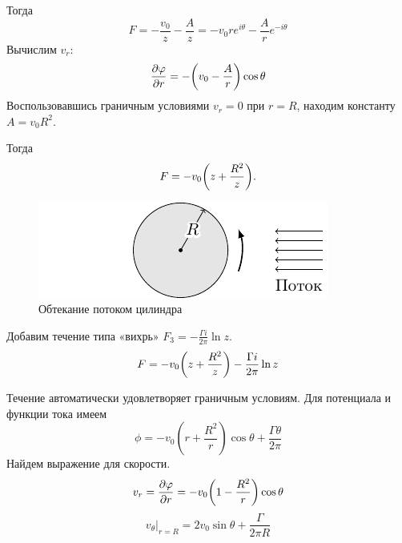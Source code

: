 Тогда
 $$ F=-\frac{v_0}{z}-\frac{A}{z}=-v_0r e^{i\theta} -\frac{A}{r} e^{-i\theta}$$
Вычислим $v_r$:
\begin{equation}
	\pdv{\varphi}{r}=-\qty(v_0-\frac{A}{r})\cos\theta
\end{equation}
Воспользовавшись граничным условиями $v_r=0$ при $r=R$, находим константу $A=v_0R^2$.

Тогда
\begin{equation}
	F=-v_0\qty(z+\frac{R^2}{z}).
\end{equation}
\begin{figure}[h!]
    \centering
	\includegraphics[scale=1.5]{img/cyl2}
    \caption{Обтекание потоком цилиндра}
    \label{fig:figure1}
\end{figure}

Добавим течение типа «вихрь» $F_3=-\frac{\Gamma i}{2\pi}\ln{z}$.
\begin{equation}
	F=-v_0\qty(z+\frac{R^2}{z})-\frac{\Gamma i}{2\pi}\ln{z}
\end{equation}

Течение автоматически удовлетворяет граничным условиям. Для
потенциала и функции тока имеем
$$\phi = -v_0 \left( r+\frac{R^2}{r}\right)\cos\theta + \frac{\Gamma \theta}{2\pi}$$
Найдем выражение для скорости.
\begin{equation}
	v_r=\pdv{\varphi}{r}=-v_0\qty(1-\frac{R^2}{r})\cos\theta
\end{equation}
\begin{equation}
	v_\theta\bigg|_{r=R}=2v_0\sin\theta+\frac{\Gamma}{2\pi R}
\end{equation}

